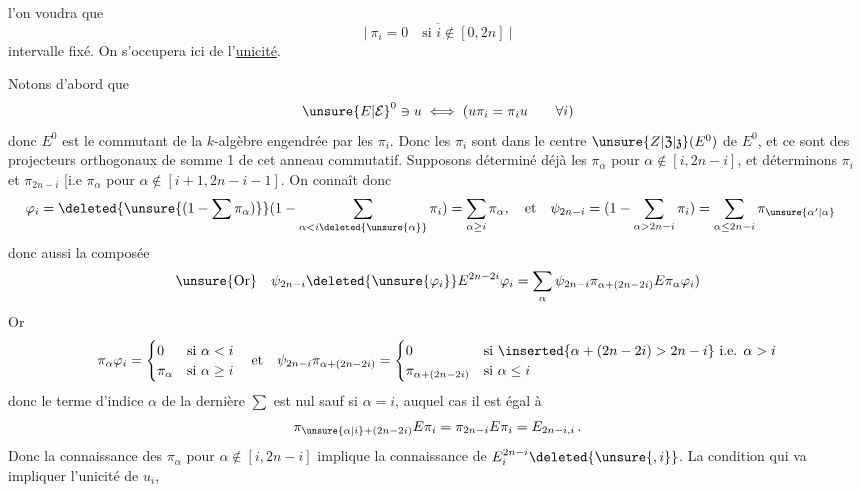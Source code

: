 
 l'on voudra que
\[
 \overline{\left|\ \pi_i=0\quad\text{si }i\notin[0,2n]\ \right|}\tag*{(3.0)}
\]
intervalle  fixé.  On s'occupera ici de l'\uline{unicité}. 

Notons d'abord que
\[
 \unsure{E|\mathcal E}^0\ni u\iff (u\pi_i=\pi_i u\qquad\forall i)
\]
donc $E^0$ est le commutant de la $k$-algèbre engendrée par les $\pi_i$. Donc les $\pi_i$ sont dans le centre $\unsure{Z|\mathfrak Z|\mathfrak z}(E^0)$ de $E^0$, et ce sont des projecteurs  orthogonaux de somme 1 de cet anneau commutatif. Supposons déterminé déjà les $\pi_\alpha$ pour $\alpha\notin[i,2n-i]$,  et déterminons $\pi_i$ et $\pi_{2n-i}$ [i.e $\pi_\alpha$ pour $\alpha\notin[i+1,2n-i-1]$.  On connaît donc
\[
 \begin{aligned}
 \varphi_i&=\deleted{\unsure{(1-\sum\pi_\alpha)}}(1-\sum_{\alpha<i\deleted{\unsure{\alpha}}}\pi_i)=\sum_{\alpha\ge i}\pi_\alpha,\quad\text{et}\quad
 \psi_{2n-i}=(1-\sum_{\alpha>2n-i}\pi_i)=\sum_{\alpha\le 2n-i}\pi_{\unsure{\alpha'|\alpha}}
 \end{aligned}
\]
donc aussi la composée
\[
 \unsure{\text{Or}}\quad \psi_{2n-i}\deleted{\unsure{\varphi_i}}E^{2n-2i}\varphi_i
 =\sum_\alpha\psi_{2n-i}\pi_{\alpha+(2n-2i)}E\pi_\alpha\varphi_i)
\]
Or
\[
 \pi_\alpha\varphi_i=\begin{cases}0&\text{si }\alpha<i\\ \pi_\alpha&\text{si }\alpha\ge i\end{cases}
 \quad\text{et}\quad
 \psi_{2n-i}\pi_{\alpha+(2n-2i)}
 =\begin{cases}
 0&\text{si }\inserted{\alpha+(2n-2i)>2n-i}\ \text{i.e. }\alpha>i\\
 \pi_{\alpha+(2n-2i)}&\text{si }\alpha\le i
 \end{cases}
\]
donc le terme d'indice $\alpha$ de la dernière $\sum$ est nul sauf si $\alpha=i$, auquel cas il est égal à
\[
 \pi_{\unsure{\alpha|i}+(2n-2i)}E\pi_i=\pi_{2n-i}E\pi_i=E_{2n-i,i}\,.
\]
Donc la connaissance des $\pi_\alpha$ pour $\alpha\notin[i,2n-i]$ implique la connaissance de $E^{2n-i}_{i}\deleted{\unsure{,i}}$.  La condition qui va impliquer l'unicité  de $u_i$,

